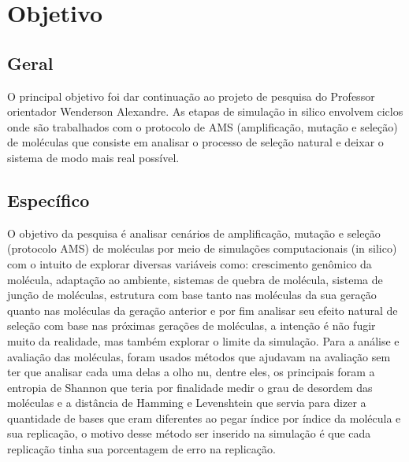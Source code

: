 \section{Objetivo}

\subsection{Geral}

O principal objetivo foi dar continuação ao projeto de pesquisa do Professor
orientador Wenderson Alexandre. As etapas de simulação in silico envolvem ciclos onde
são trabalhados com o protocolo de AMS (amplificação, mutação e seleção) de moléculas
que consiste em analisar o processo de seleção natural e deixar o sistema de modo mais
real possível.

\subsection{Específico}

O objetivo da pesquisa é analisar cenários de amplificação, mutação e seleção
(protocolo AMS) de moléculas por meio de simulações computacionais (in silico) com o
intuito de explorar diversas variáveis como: crescimento genômico da molécula,
adaptação ao ambiente, sistemas de quebra de molécula, sistema de junção de moléculas,
estrutura com base tanto nas moléculas da sua geração quanto nas moléculas da geração
anterior e por fim analisar seu efeito natural de seleção com base nas próximas gerações
de moléculas, a intenção é não fugir muito da realidade, mas também explorar o limite da
simulação. Para a análise e avaliação das moléculas, foram usados métodos que ajudavam
na avaliação sem ter que analisar cada uma delas a olho nu, dentre eles, os principais
foram a entropia de Shannon que teria por finalidade medir o grau de desordem das
moléculas e a distância de Hamming e Levenshtein que servia para dizer a quantidade de
bases que eram diferentes ao pegar índice por índice da molécula e sua replicação, o
motivo desse método ser inserido na simulação é que cada replicação tinha sua
porcentagem de erro na replicação.